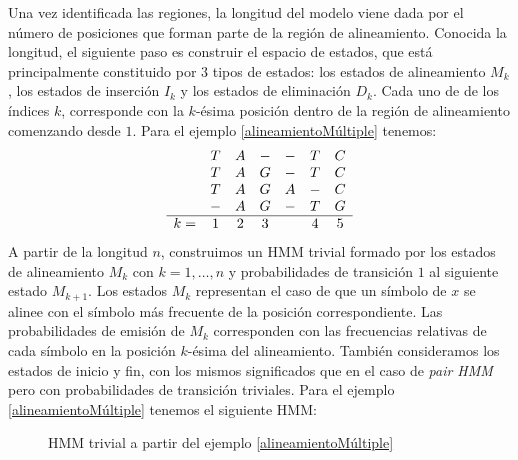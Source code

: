 Una vez identificada las regiones, la longitud del modelo viene dada por el número de posiciones que forman parte de la región de alineamiento. Conocida la longitud, el siguiente paso es construir el espacio de estados, que está principalmente constituido por $3$ tipos de estados: los estados de alineamiento $M_k$, los estados de inserción $I_k$ y los estados de eliminación $D_k$. Cada uno de de los índices $k$, corresponde con la $k$-ésima posición dentro de la región de alineamiento comenzando desde $1$. 
Para el ejemplo \ref{alineamientoMúltiple} tenemos:
\[\begin{array}{c c c c c c c}
   & T & A & - & -  & T & C \\
   & T & A & G & -  & T & C \\
   & T & A & G & A  & - & C \\
   & - & A & G & -  & T & G \\
   \hline
  k= & 1 & 2 & 3 & & 4 & 5 
\end{array}\]   
A partir de la longitud $n$, construimos un HMM trivial formado por los estados de alineamiento $M_k$ con $k=1,\dots, n$ y probabilidades de transición $1$ al siguiente estado $M_{k+1}$. Los estados $M_k$ representan el caso de que un símbolo de $x$ se alinee con el símbolo más frecuente de la posición correspondiente. Las probabilidades de emisión de $M_k$ corresponden con las frecuencias relativas de cada símbolo en la posición $k$-ésima del alineamiento. También consideramos los estados de inicio y fin, con los mismos significados que en el caso de \textit{pair HMM} pero con probabilidades de transición triviales. Para el ejemplo \ref{alineamientoMúltiple} tenemos el siguiente HMM:

\begin{figure}[H]
\centering
{}
\caption{HMM trivial a partir del ejemplo \ref{alineamientoMúltiple}}
\end{figure}

